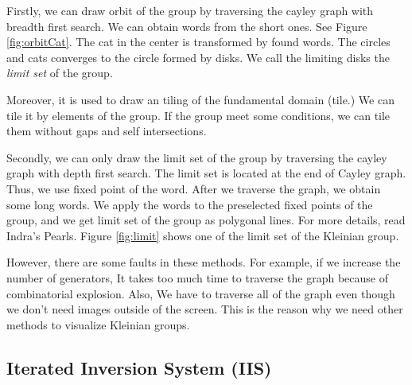 Firstly, we can draw orbit of the group by traversing the cayley graph with
breadth first search. We can obtain words from the short ones.
See Figure \ref{fig:orbitCat}.%
The cat in the center is transformed by found words.
The circles and cats converges to the circle formed by disks.
We call the limiting disks the \textit{limit set} of the group.

Moreover, it is used to draw an tiling of the fundamental domain (tile.)
We can tile it by elements of the group.
If the group meet some conditions, we can tile them without gaps and
self intersections.%

Secondly, we can only draw the limit set of the group by traversing the
cayley graph with depth first search.
The limit set is located at the end of Cayley graph. Thus, we use fixed
point of the word.
After we traverse the graph, we obtain some long words.
We apply the words to the preselected fixed points of the group, and
we get limit set of the group as polygonal lines.
For more details, read Indra's Pearls.
Figure \ref{fig:limit} shows one of the limit set of the Kleinian group.

However, there are some faults in these methods.
For example, if we increase the number of generators,
It takes too much time to traverse the graph because of
combinatorial explosion.
Also, We have to traverse all of the graph
even though we don't need images outside of the screen.
This is the reason why we need other methods to visualize Kleinian
groups.

\subsection{Iterated Inversion System (IIS)}

